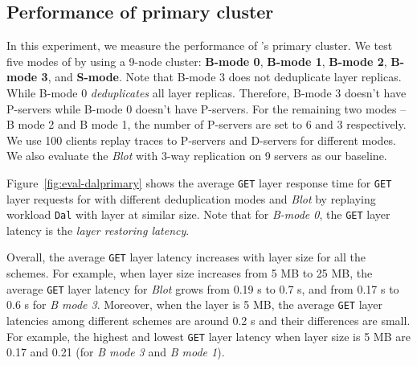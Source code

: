 


\subsection{Performance of primary cluster }
In this experiment,
we measure the performance of \sysname's primary cluster.
%
We test five modes of \sysname by using a 9-node cluster:
\textbf{B-mode 0},
\textbf{B-mode 1},
\textbf{B-mode 2},
\textbf{B-mode 3}, and
\textbf{S-mode}.
Note that B-mode 3 does not deduplicate layer replicas.
While B-mode 0 \emph{deduplicates} all layer replicas. 
Therefore, B-mode 3 doesn't have P-servers while
B-mode 0 doesn't have P-servers.
%
For the remaining two modes --
B mode 2 and B mode 1,
the number of P-servers are set to 6 and 3 respectively.
We use 100 clients replay traces to P-servers and D-servers for different modes.
We also evaluate the \emph{Blot} with 3-way replication on 9 servers as our baseline. 

Figure~\ref{fig:eval-dalprimary} shows the average \texttt{GET} layer response time 
for \texttt{GET} layer requests for \sysname with different deduplication modes 
and \emph{Blot} by replaying workload \texttt{Dal} with layer at similar size.
Note that for \emph{B-mode 0}, 
the \texttt{GET} layer latency is the \emph{layer restoring latency}.


Overall, 
the average \texttt{GET} layer latency increases with layer size for all the schemes.
For example,
when layer size increases from 5 MB to 25 MB,
the average \texttt{GET} layer latency for \emph{Blot} grows from 0.19 s to 0.7 s,
and from 0.17 s to 0.6 s for \emph{B mode 3}.
Moreover,
when the layer is 5 MB, 
the average \texttt{GET} layer latencies among different schemes are around 0.2 s and
their differences are small.
For example,
the highest and lowest \texttt{GET} layer latency when layer size is 5 MB
are 0.17 and 0.21 (for \emph{B mode 3} and \emph{B mode 1}).

